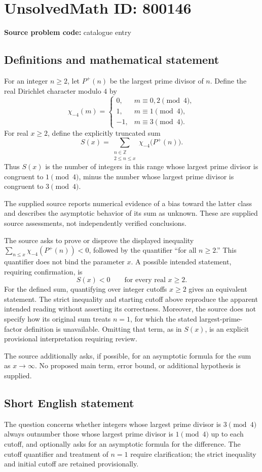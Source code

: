 \documentclass[11pt]{article}
\newcommand{\Z}{\mathbb{Z}}
\begin{document}
\section*{UnsolvedMath ID: 800146}
\textbf{Source problem code:} catalogue entry
\subsection{Definitions and mathematical statement}
For an integer \(n\ge 2\), let \(P^+(n)\) be the largest prime divisor of \(n\). Define the real Dirichlet character modulo \(4\) by
\[
\chi_{-4}(m)=\begin{cases}
0,&m\equiv 0,2\pmod 4,\\
1,&m\equiv 1\pmod 4,\\
-1,&m\equiv 3\pmod 4.
\end{cases}
\]
For real \(x\ge 2\), define the explicitly truncated sum
\[
S(x)=\sum_{\substack{n\in\Z\\2\le n\le x}}\chi_{-4}\bigl(P^+(n)\bigr).
\]
Thus \(S(x)\) is the number of integers in this range whose largest prime divisor is congruent to \(1\pmod 4\), minus the number whose largest prime divisor is congruent to \(3\pmod 4\).

The supplied source reports numerical evidence of a bias toward the latter class and describes the asymptotic behavior of its sum as unknown. These are supplied source assessments, not independently verified conclusions.

The source asks to prove or disprove the displayed inequality \(\sum_{n\le x}\chi_{-4}(P^+(n))<0\), followed by the quantifier ``for all \(n\ge 2\).'' This quantifier does not bind the parameter \(x\). A possible intended statement, requiring confirmation, is
\[
S(x)<0\qquad\text{for every real }x\ge 2.
\]
For the defined sum, quantifying over integer cutoffs \(x\ge 2\) gives an equivalent statement. The strict inequality and starting cutoff above reproduce the apparent intended reading without asserting its correctness. Moreover, the source does not specify how its original sum treats \(n=1\), for which the stated largest-prime-factor definition is unavailable. Omitting that term, as in \(S(x)\), is an explicit provisional interpretation requiring review.

The source additionally asks, if possible, for an asymptotic formula for the sum as \(x\to\infty\). No proposed main term, error bound, or additional hypothesis is supplied.
\subsection{Short English statement}
The question concerns whether integers whose largest prime divisor is \(3\pmod 4\) always outnumber those whose largest prime divisor is \(1\pmod 4\) up to each cutoff, and optionally asks for an asymptotic formula for the difference. The cutoff quantifier and treatment of \(n=1\) require clarification; the strict inequality and initial cutoff are retained provisionally.
\end{document}
